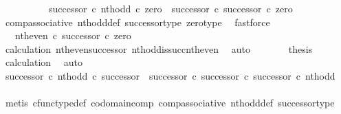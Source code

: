 \begin{isabellebody}
\ \ \isamarkupfalse%
\ {\isacharminus}{\kern0pt}\isanewline
\ \ \ \ \isamarkupfalse%
\ {\isachardoublequoteopen}{\isacharparenleft}{\kern0pt}successor\ {\isasymcirc}\isactrlsub c\ nth{\isacharunderscore}{\kern0pt}odd{\isacharparenright}{\kern0pt}\ {\isasymcirc}\isactrlsub c\ zero\ {\isacharequal}{\kern0pt}\ successor\ {\isasymcirc}\isactrlsub c\ successor\ {\isasymcirc}\isactrlsub c\ zero{\isachardoublequoteclose}\isanewline
\ \ \ \ \ \ \isamarkupfalse%
\ comp{\isacharunderscore}{\kern0pt}associative{}\ nth{\isacharunderscore}{\kern0pt}odd{\isacharunderscore}{\kern0pt}def{}\ successor{\isacharunderscore}{\kern0pt}type\ zero{\isacharunderscore}{\kern0pt}type\ \isamarkupfalse%
\ fastforce\isanewline
\ \ \ \ \isamarkupfalse%
\ \isamarkupfalse%
\ {\isachardoublequoteopen}{\isachardot}{\kern0pt}{\isachardot}{\kern0pt}{\isachardot}{\kern0pt}\ {\isacharequal}{\kern0pt}\ {\isacharparenleft}{\kern0pt}nth{\isacharunderscore}{\kern0pt}even\ {\isasymcirc}\isactrlsub c\ successor{\isacharparenright}{\kern0pt}\ {\isasymcirc}\isactrlsub c\ zero{\isachardoublequoteclose}\isanewline
\ \ \ \ \ \ \isamarkupfalse%
\ calculation\ nth{\isacharunderscore}{\kern0pt}even{\isacharunderscore}{\kern0pt}successor{}\ nth{\isacharunderscore}{\kern0pt}odd{\isacharunderscore}{\kern0pt}is{\isacharunderscore}{\kern0pt}succ{\isacharunderscore}{\kern0pt}nth{\isacharunderscore}{\kern0pt}even\ \isamarkupfalse%
\ auto\isanewline
\ \ \ \ \isamarkupfalse%
\ \isamarkupfalse%
\ {\isacharquery}{\kern0pt}thesis\isanewline
\ \ \ \ \ \ \isamarkupfalse%
\ calculation\ \isamarkupfalse%
\ auto\isanewline
\ \ \isamarkupfalse%
\isanewline
\isanewline
\ \ \isamarkupfalse%
\ {\isachardoublequoteopen}{\isacharparenleft}{\kern0pt}successor\ {\isasymcirc}\isactrlsub c\ nth{\isacharunderscore}{\kern0pt}odd{\isacharparenright}{\kern0pt}\ {\isasymcirc}\isactrlsub c\ successor\ {\isacharequal}{\kern0pt}\ {\isacharparenleft}{\kern0pt}successor\ {\isasymcirc}\isactrlsub c\ successor{\isacharparenright}{\kern0pt}\ {\isasymcirc}\isactrlsub c\ successor\ {\isasymcirc}\isactrlsub c\ nth{\isacharunderscore}{\kern0pt}odd{\isachardoublequoteclose}\isanewline
\ \ \ \ \isamarkupfalse%
\ {\isacharparenleft}{\kern0pt}metis\ cfunc{\isacharunderscore}{\kern0pt}type{\isacharunderscore}{\kern0pt}def\ codomain{\isacharunderscore}{\kern0pt}comp\ comp{\isacharunderscore}{\kern0pt}associative\ nth{\isacharunderscore}{\kern0pt}odd{\isacharunderscore}{\kern0pt}def{}\ successor{\isacharunderscore}{\kern0pt}type{\isacharparenright}{\kern0pt}\isanewline

\end{isabellebody}

